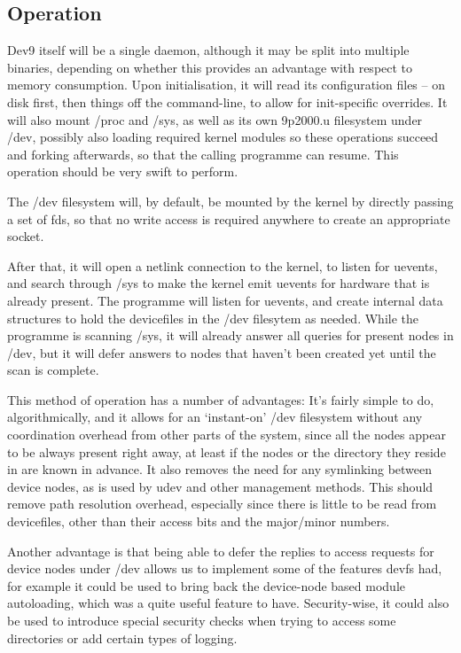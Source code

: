 \documentclass[a4paper,twoside,titlepage]{article}
\begin{document}
\subsection{Operation}
Dev9 itself will be a single daemon, although it may be split into multiple
binaries, depending on whether this provides an advantage with respect to memory
consumption. Upon initialisation, it will read its configuration files -- on
disk first, then things off the command-line, to allow for init-specific
overrides. It will also mount /proc and /sys, as well as its own 9p2000.u
filesystem under /dev, possibly also loading required kernel modules so these
operations succeed and forking afterwards, so that the calling programme can
resume. This operation should be very swift to perform.

The /dev filesystem will, by default, be mounted by the kernel by directly
passing a set of fds, so that no write access is required anywhere to create an
appropriate socket.

After that, it will open a netlink connection to the kernel, to listen for
uevents, and search through /sys to make the kernel emit uevents for hardware
that is already present. The programme will listen for uevents, and create
internal data structures to hold the devicefiles in the /dev filesytem as
needed. While the programme is scanning /sys, it will already answer all queries
for present nodes in /dev, but it will defer answers to nodes that haven't been
created yet until the scan is complete.

This method of operation has a number of advantages: It's fairly simple to do,
algorithmically, and it allows for an `instant-on' /dev filesystem without any
coordination overhead from other parts of the system, since all the nodes appear
to be always present right away, at least if the nodes or the directory they
reside in are known in advance. It also removes the need for any symlinking
between device nodes, as is used by udev and other management methods. This
should remove path resolution overhead, especially since there is little to be
read from devicefiles, other than their access bits and the major/minor numbers.

Another advantage is that being able to defer the replies to access requests for
device nodes under /dev allows us to implement some of the features devfs had,
for example it could be used to bring back the device-node based module
autoloading, which was a quite useful feature to have. Security-wise, it could
also be used to introduce special security checks when trying to access some
directories or add certain types of logging.
\end{document}
